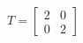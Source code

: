 \documentclass[preview]{standalone}
\begin{document}
\begin{align*}
T = \begin{bmatrix} 2 & 0 \\ 0 & 2\end{bmatrix}
\end{align*}
\end{document}
